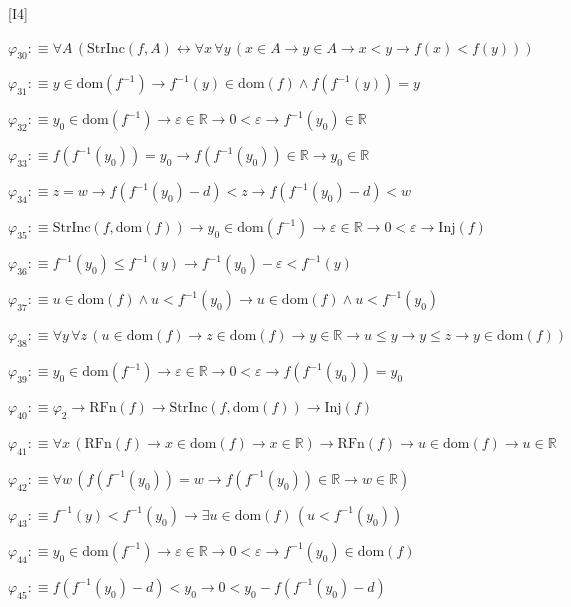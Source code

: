 \begin{fullproof}{[I4]}
\begin{abbrevlist}
\item $\varphi_{30} :\equiv \forall A\,(\mathrm{StrInc}(f,A) \leftrightarrow \forall x\,\forall y\,(x \in A \to y \in A \to x < y \to f(x) < f(y)))$
\item $\varphi_{31} :\equiv y \in \mathrm{dom}(f^{-1}) \to f^{-1}(y) \in \mathrm{dom}(f) \land f(f^{-1}(y)) = y$
\item $\varphi_{32} :\equiv y_{0} \in \mathrm{dom}(f^{-1}) \to \varepsilon \in \mathbb{R} \to 0 < \varepsilon \to f^{-1}(y_{0}) \in \mathbb{R}$
\item $\varphi_{33} :\equiv f(f^{-1}(y_{0})) = y_{0} \to f(f^{-1}(y_{0})) \in \mathbb{R} \to y_{0} \in \mathbb{R}$
\item $\varphi_{34} :\equiv z = w \to f(f^{-1}(y_{0}) - d) < z \to f(f^{-1}(y_{0}) - d) < w$
\item $\varphi_{35} :\equiv \mathrm{StrInc}(f,\mathrm{dom}(f)) \to y_{0} \in \mathrm{dom}(f^{-1}) \to \varepsilon \in \mathbb{R} \to 0 < \varepsilon \to \mathrm{Inj}(f)$
\item $\varphi_{36} :\equiv f^{-1}(y_{0}) \leq f^{-1}(y) \to f^{-1}(y_{0}) - \varepsilon < f^{-1}(y)$
\item $\varphi_{37} :\equiv u \in \mathrm{dom}(f) \land u < f^{-1}(y_{0}) \to u \in \mathrm{dom}(f) \land u < f^{-1}(y_{0})$
\item $\varphi_{38} :\equiv \forall y\,\forall z\,(u \in \mathrm{dom}(f) \to z \in \mathrm{dom}(f) \to y \in \mathbb{R} \to u \leq y \to y \leq z \to y \in \mathrm{dom}(f))$
\item $\varphi_{39} :\equiv y_{0} \in \mathrm{dom}(f^{-1}) \to \varepsilon \in \mathbb{R} \to 0 < \varepsilon \to f(f^{-1}(y_{0})) = y_{0}$
\item $\varphi_{40} :\equiv \varphi_{2} \to \mathrm{RFn}(f) \to \mathrm{StrInc}(f,\mathrm{dom}(f)) \to \mathrm{Inj}(f)$
\item $\varphi_{41} :\equiv \forall x\,(\mathrm{RFn}(f) \to x \in \mathrm{dom}(f) \to x \in \mathbb{R}) \to \mathrm{RFn}(f) \to u \in \mathrm{dom}(f) \to u \in \mathbb{R}$
\item $\varphi_{42} :\equiv \forall w\,(f(f^{-1}(y_{0})) = w \to f(f^{-1}(y_{0})) \in \mathbb{R} \to w \in \mathbb{R})$
\item $\varphi_{43} :\equiv f^{-1}(y) < f^{-1}(y_{0}) \to \exists u \in \mathrm{dom}(f)\,(u < f^{-1}(y_{0}))$
\item $\varphi_{44} :\equiv y_{0} \in \mathrm{dom}(f^{-1}) \to \varepsilon \in \mathbb{R} \to 0 < \varepsilon \to f^{-1}(y_{0}) \in \mathrm{dom}(f)$
\item $\varphi_{45} :\equiv f(f^{-1}(y_{0}) - d) < y_{0} \to 0 < y_{0} - f(f^{-1}(y_{0}) - d)$

\end{abbrevlist}
\end{fullproof}
